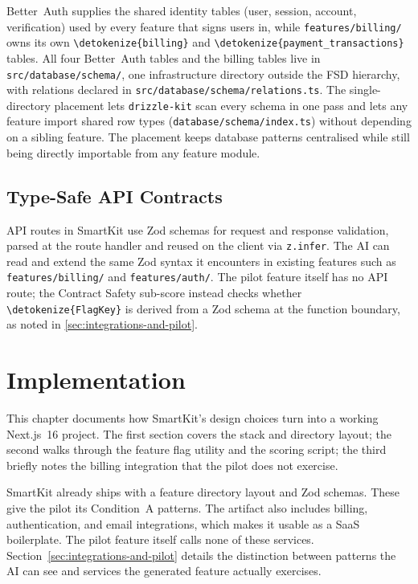 \documentclass[12pt,a4paper]{report}
\newcommand{\code}[1]{\texttt{\nolinkurl{\detokenize{#1}}}}
\newcommand{\pkg}[1]{\texttt{\nolinkurl{#1}}}
\DeclareRobustCommand{\filename}[1]{\bgroup\urlstyle{tt}\nolinkurl{#1}\egroup}
\begin{document}
Better~Auth supplies the shared identity tables (user, session, account, verification) used by every feature that signs users in, while \filename{features/billing/} owns its own \code{billing} and \code{payment\_transactions} tables. All four Better~Auth tables and the billing tables live in \filename{src/database/schema/}, one infrastructure directory outside the FSD hierarchy, with relations declared in \filename{src/database/schema/relations.ts}. The single-directory placement lets \pkg{drizzle-kit} scan every schema in one pass and lets any feature import shared row types (\filename{database/schema/index.ts}) without depending on a sibling feature. The placement keeps database patterns centralised while still being directly importable from any feature module.

\section{Type-Safe API Contracts}

API routes in SmartKit use Zod schemas for request and response validation, parsed at the route handler and reused on the client via \pkg{z.infer}. The AI can read and extend the same Zod syntax it encounters in existing features such as \filename{features/billing/} and \filename{features/auth/}. The pilot feature itself has no API route; the Contract Safety sub-score instead checks whether \code{FlagKey} is derived from a Zod schema at the function boundary, as noted in \autoref{sec:integrations-and-pilot}.

\chapter{Implementation}
\label{sec:implementation}

This chapter documents how SmartKit's design choices turn into a working Next.js~16 project. The first section covers the stack and directory layout; the second walks through the feature flag utility and the scoring script; the third briefly notes the billing integration that the pilot does not exercise.

SmartKit already ships with a feature directory layout and Zod schemas. These give the pilot its Condition~A patterns. The artifact also includes billing, authentication, and email integrations, which makes it usable as a SaaS boilerplate. The pilot feature itself calls none of these services. Section~\ref{sec:integrations-and-pilot} details the distinction between patterns the AI can see and services the generated feature actually exercises.
\end{document}

